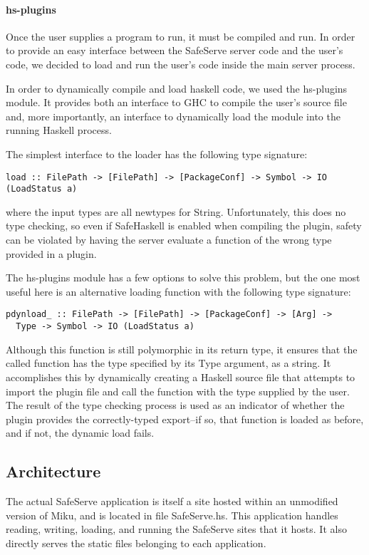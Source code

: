 \documentclass[12pt]{article}
\begin{document}
\paragraph{hs-plugins}
Once the user supplies a program to run, it must be compiled and run.
In order to provide an easy interface between the SafeServe server code
and the user's code, we decided to load and run the user's code inside
the main server process.

In order to dynamically compile and load haskell code, we used the hs-plugins
module.  It provides both an interface to GHC to compile the user's source
file and, more importantly, an interface to dynamically load the module into
the running Haskell process.

The simplest interface to the loader has the following type signature:

\begin{verbatim}
load :: FilePath -> [FilePath] -> [PackageConf] -> Symbol -> IO (LoadStatus a)
\end{verbatim}

where the input types are all newtypes for String.  Unfortunately, this does
no type checking, so even if SafeHaskell is enabled when compiling the plugin,
safety can be violated by having the server evaluate a function of the wrong
type provided in a plugin.

The hs-plugins module has a few options to solve this problem, but the one
most useful here is an alternative loading function with the following type
signature:

\begin{verbatim}
pdynload_ :: FilePath -> [FilePath] -> [PackageConf] -> [Arg] ->
  Type -> Symbol -> IO (LoadStatus a)
\end{verbatim}

Although this function is still polymorphic in its return type,
it ensures that the called function has the type specified by its
Type argument, as a string.  It accomplishes this by dynamically creating
a Haskell source file that attempts to import the plugin file and
call the function with the type supplied by the user.  The result
of the type checking process is used as an indicator of whether the plugin
provides the correctly-typed export--if so, that function is loaded as
before, and if not, the dynamic load fails.

\subsection{Architecture}
The actual SafeServe application is itself a site hosted within an unmodified
version of Miku, and is located in file SafeServe.hs.  This application handles
reading, writing, loading, and running the SafeServe sites that it hosts.
It also directly serves the static files belonging to each application.
\end{document}

